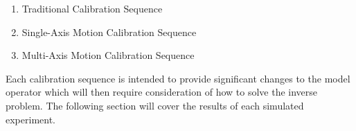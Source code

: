 \begin{enumerate}
	\item Traditional Calibration Sequence
	\item Single-Axis Motion Calibration Sequence
	\item Multi-Axis Motion Calibration Sequence
\end{enumerate}
	
Each calibration sequence is intended to provide significant changes to the model operator which will then require consideration of how to solve the inverse problem. The following section will cover the results of each simulated experiment. 

